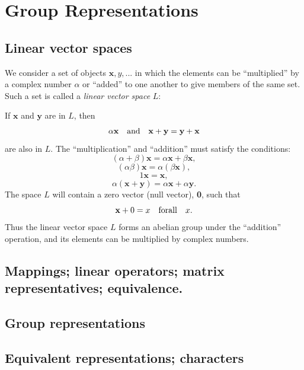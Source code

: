 \documentclass[12pt]{book}
\begin{document}



\chapter{Group Representations}

\section{Linear vector spaces}

\def\bx{\mathbf x}
\def\by{\mathbf y}

We consider a set of objects ${\mathbf x,y,...}$ in which the elements
can be ``multiplied'' by a complex number $\alpha$ or ``added'' to one
another to give members of the same set. Such a set is called a {\it
  linear vector space} $L$:

If $\bx$ and $\by$ are in $L$, then
$$
\alpha{\mathbf x} \quad {\rm and} \quad {\bx+\by = \by+\bx}
$$ are also in $L$. The ``multiplication'' and ``addition'' must
satisfy the conditions:
$$(\alpha + \beta)\bx = \alpha\bx + \beta\bx,$$
$$(\alpha\beta)\bx = \alpha(\beta\bx),$$
$$1\bx = \bx,$$
$$\alpha(\bx+\by) = \alpha\bx + \alpha\by.$$
The space $L$ will contain a zero vector (null vector), {\bf 0}, such that
$$\mathbf x + 0 = x \quad {\rm for all} \quad x.$$
Thus the linear vector space $L$ forms an abelian group under the
``addition'' operation, and its elements can be multiplied by complex numbers.

\section{}
\section{}
\section{Mappings; linear operators; matrix representatives; \break equi\-valence.}
\section{Group representations}
\section{Equivalent representations; characters}
\end{document}
